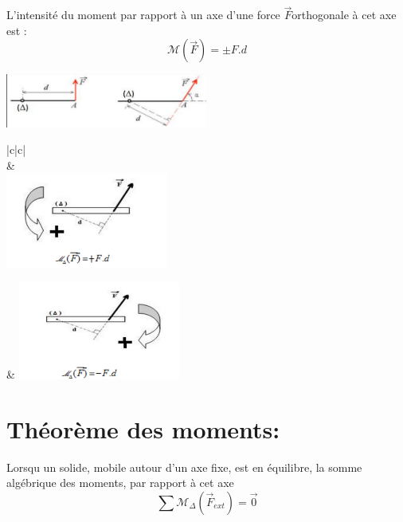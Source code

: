 \documentclass[12pt]{article}
\begin{document}
L'intensité du moment par rapport à un axe d'une force $\vec{F}$orthogonale à cet axe est :$$\mathscr{M}(\vec{F}) = \pm F.d$$ 
\begin{center}
\includegraphics[width=0.5\textwidth]{./img/img_01.png}
\end{center}
\begin{center}
\begin{tabular}{ |c|c|  }
 \hline
  {} \\
 \hline
   &
  \\
 \hline
  \includegraphics[width=0.4\textwidth]{./img/img_03.png} 

  & 
\includegraphics[width=0.4\textwidth]{./img/img_02.png}\\

 \hline
\end{tabular}
\end{center}

\section{Théorème des moments:}
Lorsqu un solide, mobile autour d'un axe fixe, est en équilibre, la somme algébrique des moments, par rapport à cet axe
$$\sum\mathscr{M}_{\Delta}(\vec{F}_{ext}) = \vec{0}$$
\end{document}
